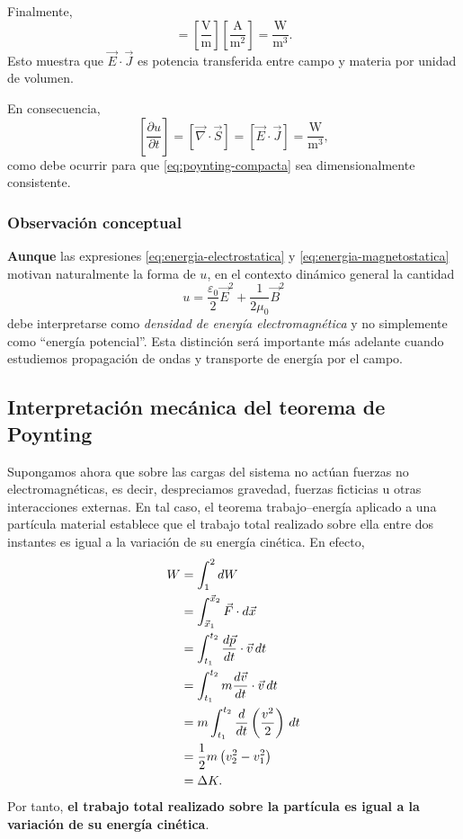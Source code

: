 \documentclass[12pt,a4paper]{article}
\theoremstyle{definition}
\theoremstyle{plain}
\numberwithin{equation}{section}
\theoremstyle{remark}
\newcommand{\E}{\vec{E}}
\newcommand{\B}{\vec{B}}
\newcommand{\J}{\vec{J}}
\begin{document}
Finalmente,
\begin{equation*}
    [\E\cdot\J]
    =
    \left[\frac{\mathrm{V}}{\mathrm{m}}\right]
    \left[\frac{\mathrm{A}}{\mathrm{m}^2}\right]
    =
    \frac{\mathrm{W}}{\mathrm{m}^3}.
\end{equation*}
Esto muestra que $\E\cdot\J$ es potencia transferida entre campo y materia por unidad de volumen.

En consecuencia,
\begin{equation*}
    \left[\frac{\partial u}{\partial t}\right]
    =
    \left[\vec\nabla\cdot\vec S\right]
    =
    [\E\cdot\J]
    =
    \frac{\mathrm{W}}{\mathrm{m}^3},
\end{equation*}
como debe ocurrir para que \eqref{eq:poynting-compacta} sea dimensionalmente consistente.

\subsubsection*{Observación conceptual}

\textbf{Aunque} las expresiones \eqref{eq:energia-electrostatica} y \eqref{eq:energia-magnetostatica} motivan naturalmente la forma de $u$, en el contexto dinámico general la cantidad
\begin{equation*}
    u=\frac{\varepsilon_0}{2}\E^2+\frac{1}{2\mu_0}\B^2
\end{equation*}
debe interpretarse como \emph{densidad de energía electromagnética} y no simplemente como ``energía potencial''. Esta distinción será importante más adelante cuando estudiemos propagación de ondas y transporte de energía por el campo.


\subsection{Interpretación mecánica del teorema de Poynting}

Supongamos ahora que sobre las cargas del sistema no actúan fuerzas no electromagnéticas, es decir, despreciamos gravedad, fuerzas ficticias u otras interacciones externas. En tal caso, el teorema trabajo--energía aplicado a una partícula material establece que el trabajo total realizado sobre ella entre dos instantes es igual a la variación de su energía cinética. En efecto,
\begin{align*}
    W
    &=\int_1^2 dW \notag\\
    &=\int_{\vec x_1}^{\vec x_2}\vec F\cdot d\vec x \notag\\
    &=\int_{t_1}^{t_2}\frac{d\vec p}{dt}\cdot\vec v\,dt \notag\\
    &=\int_{t_1}^{t_2}m\frac{d\vec v}{dt}\cdot\vec v\,dt \notag\\
    &=m\int_{t_1}^{t_2}\frac{d}{dt}\left(\frac{v^2}{2}\right)\,dt \notag\\
    &=\frac{1}{2}m\left(v_2^2-v_1^2\right) \notag\\
    &=\Delta K.
\end{align*}
Por tanto, \textbf{el trabajo total realizado sobre la partícula es igual a la variación de su energía cinética}.
\end{document}
